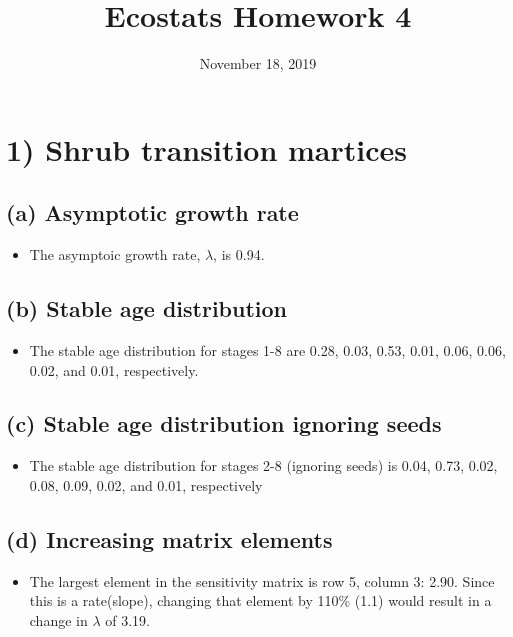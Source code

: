 \documentclass[]{article}
\title{Ecostats Homework 4}
\author{}
\date{November 18, 2019}
\providecommand{\tightlist}{%
  \setlength{\itemsep}{0pt}\setlength{\parskip}{0pt}}
\begin{document}
\maketitle

\section{1) Shrub transition martices}\label{shrub-transition-martices}

\subsection{(a) Asymptotic growth rate}\label{a-asymptotic-growth-rate}

\begin{itemize}
\tightlist
\item
  The asymptoic growth rate, \(\lambda\), is 0.94.
\end{itemize}

\subsection{(b) Stable age
distribution}\label{b-stable-age-distribution}

\begin{itemize}
\tightlist
\item
  The stable age distribution for stages 1-8 are 0.28, 0.03, 0.53, 0.01,
  0.06, 0.06, 0.02, and 0.01, respectively.
\end{itemize}

\subsection{(c) Stable age distribution ignoring
seeds}\label{c-stable-age-distribution-ignoring-seeds}

\begin{itemize}
\tightlist
\item
  The stable age distribution for stages 2-8 (ignoring seeds) is 0.04,
  0.73, 0.02, 0.08, 0.09, 0.02, and 0.01, respectively
\end{itemize}

\subsection{(d) Increasing matrix
elements}\label{d-increasing-matrix-elements}

\begin{itemize}
\tightlist
\item
  The largest element in the sensitivity matrix is row 5, column 3:
  2.90. Since this is a rate(slope), changing that element by 110\%
  (1.1) would result in a change in \(\lambda\) of 3.19.
\end{itemize}
\end{document}
